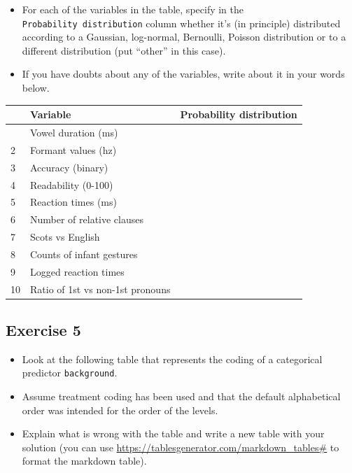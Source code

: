 \documentclass[
]{article}
\providecommand{\tightlist}{%
  \setlength{\itemsep}{0pt}\setlength{\parskip}{0pt}}
\begin{document}
\begin{itemize}
\tightlist
\item
  For each of the variables in the table, specify in the
  \texttt{Probability\ distribution} column whether it's (in principle)
  distributed according to a Gaussian, log-normal, Bernoulli, Poisson
  distribution or to a different distribution (put ``other'' in this
  case).
\item
  If you have doubts about any of the variables, write about it in your
  words below.
\end{itemize}

\begin{longtable}[]{@{}lll@{}}
\toprule\noalign{}
& Variable & Probability distribution \\
\midrule\noalign{}
\endhead
\bottomrule\noalign{}
\endlastfoot
1 & Vowel duration (ms) & \\
2 & Formant values (hz) & \\
3 & Accuracy (binary) & \\
4 & Readability (0-100) & \\
5 & Reaction times (ms) & \\
6 & Number of relative clauses & \\
7 & Scots vs English & \\
8 & Counts of infant gestures & \\
9 & Logged reaction times & \\
10 & Ratio of 1st vs non-1st pronouns & \\
\end{longtable}

\hypertarget{exercise-5}{%
\subsection{Exercise 5}\label{exercise-5}}

\begin{itemize}
\tightlist
\item
  Look at the following table that represents the coding of a
  categorical predictor \texttt{background}.
\item
  Assume treatment coding has been used and that the default
  alphabetical order was intended for the order of the levels.
\item
  Explain what is wrong with the table and write a new table with your
  solution (you can use
  \url{https://tablesgenerator.com/markdown_tables\#} to format the
  markdown table).
\end{itemize}
\end{document}
